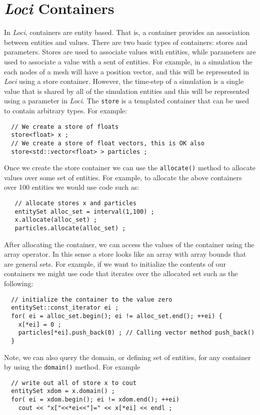 \documentclass[10pt,epsf]{book}
\begin{document}


\section{{\it Loci} Containers}

In {\it Loci}, containers are entity based.  That is, a container provides
an association between entities and values.  There are two basic types
of containers: stores and parameters.  Stores are used to associate
values with entities, while parameters are used to associate a value
with a sent of entities.  For example, in a simulation the each nodes
of a mesh will have a position vector, and this will be represented in
{\it Loci} using a store container.  However, the time-step of a simulation
is a single value that is shared by all of the simulation entities and
this will be represented using a parameter in {\it Loci}.  The {\tt store} is a
templated container that can be used to contain arbitrary types.  For
example:
\begin{verbatim}
  // We create a store of floats
  store<float> x ;
  // We create a store of float vectors, this is OK also
  store<std::vector<float> > particles ;
\end{verbatim}

Once we create the store container we can use the {\tt allocate()}
method to allocate values over some set of entities.  For example, to
allocate the above containers over 100 entities we would use code such
as:
\begin{verbatim}
   // allocate stores x and particles
   entitySet alloc_set = interval(1,100) ;
   x.allocate(alloc_set) ;
   particles.allocate(alloc_set) ;
\end{verbatim}

After allocating the container, we can access the values of the
container using the array operator.  In this sense a store looks like
an array with array bounds that are general sets.  For example, if we
want to initialize the contents of our containers we might use code
that iterates over the allocated set such as the following:
\begin{verbatim}
  // initialize the container to the value zero
  entitySet::const_iterator ei ;
  for( ei = alloc_set.begin(); ei != alloc_set.end(); ++ei) {
    x[*ei] = 0 ;
    particles[*ei].push_back(0) ; // Calling vector method push_back()
  }
\end{verbatim}

Note, we can also query the domain, or defining set of entities, for any container by using the {\tt domain()} method.  For example
\begin{verbatim}
  // write out all of store x to cout
  entitySet xdom = x.domain() ;
  for( ei = xdom.begin(); ei != xdom.end(); ++ei) 
    cout << "x["<<*ei<<"]=" << x[*ei] << endl ;
\end{verbatim}
\end{document}
